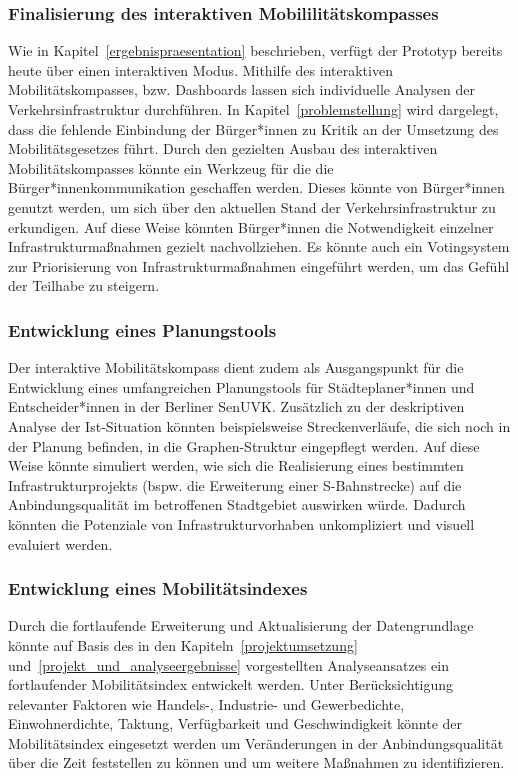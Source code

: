 \subsubsection{Finalisierung des interaktiven Mobililitätskompasses}
Wie in Kapitel~\ref{ergebnispraesentation} beschrieben, verfügt der Prototyp bereits heute über einen interaktiven Modus. Mithilfe des interaktiven Mobilitätskompasses, bzw. Dashboards lassen sich individuelle Analysen der Verkehrsinfrastruktur durchführen. In Kapitel~\ref{problemstellung} wird dargelegt, dass die fehlende Einbindung der Bürger*innen zu Kritik an der Umsetzung des Mobilitätsgesetzes führt. Durch den gezielten Ausbau des interaktiven Mobilitätskompasses könnte ein Werkzeug für die die Bürger*innenkommunikation geschaffen werden. Dieses könnte von Bürger*innen genutzt werden, um sich über den aktuellen Stand der Verkehrsinfrastruktur zu erkundigen. Auf diese Weise könnten Bürger*innen die Notwendigkeit einzelner Infrastrukturmaßnahmen gezielt nachvollziehen. Es könnte auch ein Votingsystem zur Priorisierung von Infrastrukturmaßnahmen eingeführt werden, um das Gefühl der Teilhabe zu steigern.


\subsubsection{Entwicklung eines Planungstools}
Der interaktive Mobilitätskompass dient zudem als Ausgangspunkt für die Entwicklung eines umfangreichen Planungstools für Städteplaner*innen und Entscheider*innen in der Berliner \ac{SenUVK}. Zusätzlich zu der deskriptiven Analyse der Ist-Situation könnten beispielsweise Streckenverläufe, die sich noch in der Planung befinden, in die Graphen-Struktur eingepflegt werden. Auf diese Weise könnte simuliert werden, wie sich die Realisierung eines bestimmten Infrastrukturprojekts (bspw. die Erweiterung einer S-Bahnstrecke) auf die Anbindungsqualität im betroffenen Stadtgebiet auswirken würde. Dadurch könnten die Potenziale von Infrastrukturvorhaben unkompliziert und visuell evaluiert werden.

\subsubsection{Entwicklung eines Mobilitätsindexes}\label{mobwob_index}
Durch die fortlaufende Erweiterung und Aktualisierung der Datengrundlage könnte auf Basis des in den Kapiteln~\ref{projektumsetzung} und~\ref{projekt_und_analyseergebnisse} vorgestellten Analyseansatzes ein fortlaufender Mobilitätsindex entwickelt werden. Unter Berücksichtigung relevanter Faktoren wie Handels-, Industrie- und Gewerbedichte, Einwohnerdichte, Taktung, Verfügbarkeit und Geschwindigkeit könnte der Mobilitätsindex eingesetzt werden um Veränderungen in der Anbindungsqualität über die Zeit feststellen zu können und um weitere Maßnahmen zu identifizieren.

